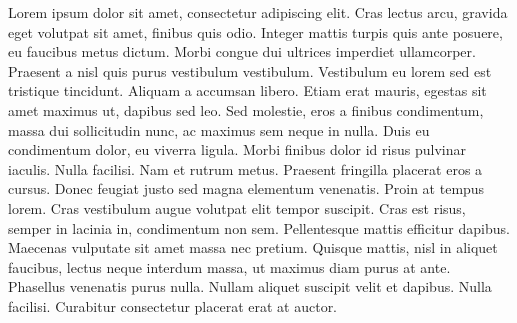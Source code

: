 Lorem ipsum dolor sit amet, consectetur adipiscing elit. 
Cras lectus arcu, gravida eget volutpat sit amet, finibus quis odio.
Integer mattis turpis quis ante posuere, eu faucibus metus dictum. 
Morbi congue dui ultrices imperdiet ullamcorper. 
Praesent a nisl quis purus vestibulum vestibulum. 
Vestibulum eu lorem sed est tristique tincidunt. 
Aliquam a accumsan libero. 
Etiam erat mauris, egestas sit amet maximus ut, dapibus sed leo. Sed molestie, eros a finibus condimentum, massa dui sollicitudin nunc, ac maximus sem neque in nulla. 
Duis eu condimentum dolor, eu viverra ligula. 
Morbi finibus dolor id risus pulvinar iaculis. 
Nulla facilisi. Nam et rutrum metus. 
Praesent fringilla placerat eros a cursus. 
Donec feugiat justo sed magna elementum venenatis. 
Proin at tempus lorem. 
Cras vestibulum augue volutpat elit tempor suscipit. 
Cras est risus, semper in lacinia in, condimentum non sem. 
Pellentesque mattis efficitur dapibus. 
Maecenas vulputate sit amet massa nec pretium. 
Quisque mattis, nisl in aliquet faucibus, lectus neque interdum massa, ut maximus diam purus at ante. 
Phasellus venenatis purus nulla. Nullam aliquet suscipit velit et dapibus. 
Nulla facilisi. 
Curabitur consectetur placerat erat at auctor.